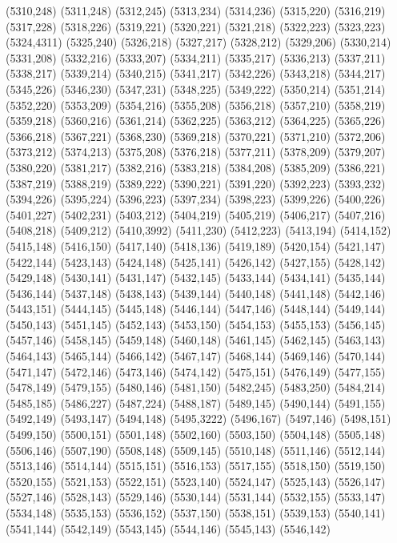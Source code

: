 (5310,248)
(5311,248)
(5312,245)
(5313,234)
(5314,236)
(5315,220)
(5316,219)
(5317,228)
(5318,226)
(5319,221)
(5320,221)
(5321,218)
(5322,223)
(5323,223)
(5324,4311)
(5325,240)
(5326,218)
(5327,217)
(5328,212)
(5329,206)
(5330,214)
(5331,208)
(5332,216)
(5333,207)
(5334,211)
(5335,217)
(5336,213)
(5337,211)
(5338,217)
(5339,214)
(5340,215)
(5341,217)
(5342,226)
(5343,218)
(5344,217)
(5345,226)
(5346,230)
(5347,231)
(5348,225)
(5349,222)
(5350,214)
(5351,214)
(5352,220)
(5353,209)
(5354,216)
(5355,208)
(5356,218)
(5357,210)
(5358,219)
(5359,218)
(5360,216)
(5361,214)
(5362,225)
(5363,212)
(5364,225)
(5365,226)
(5366,218)
(5367,221)
(5368,230)
(5369,218)
(5370,221)
(5371,210)
(5372,206)
(5373,212)
(5374,213)
(5375,208)
(5376,218)
(5377,211)
(5378,209)
(5379,207)
(5380,220)
(5381,217)
(5382,216)
(5383,218)
(5384,208)
(5385,209)
(5386,221)
(5387,219)
(5388,219)
(5389,222)
(5390,221)
(5391,220)
(5392,223)
(5393,232)
(5394,226)
(5395,224)
(5396,223)
(5397,234)
(5398,223)
(5399,226)
(5400,226)
(5401,227)
(5402,231)
(5403,212)
(5404,219)
(5405,219)
(5406,217)
(5407,216)
(5408,218)
(5409,212)
(5410,3992)
(5411,230)
(5412,223)
(5413,194)
(5414,152)
(5415,148)
(5416,150)
(5417,140)
(5418,136)
(5419,189)
(5420,154)
(5421,147)
(5422,144)
(5423,143)
(5424,148)
(5425,141)
(5426,142)
(5427,155)
(5428,142)
(5429,148)
(5430,141)
(5431,147)
(5432,145)
(5433,144)
(5434,141)
(5435,144)
(5436,144)
(5437,148)
(5438,143)
(5439,144)
(5440,148)
(5441,148)
(5442,146)
(5443,151)
(5444,145)
(5445,148)
(5446,144)
(5447,146)
(5448,144)
(5449,144)
(5450,143)
(5451,145)
(5452,143)
(5453,150)
(5454,153)
(5455,153)
(5456,145)
(5457,146)
(5458,145)
(5459,148)
(5460,148)
(5461,145)
(5462,145)
(5463,143)
(5464,143)
(5465,144)
(5466,142)
(5467,147)
(5468,144)
(5469,146)
(5470,144)
(5471,147)
(5472,146)
(5473,146)
(5474,142)
(5475,151)
(5476,149)
(5477,155)
(5478,149)
(5479,155)
(5480,146)
(5481,150)
(5482,245)
(5483,250)
(5484,214)
(5485,185)
(5486,227)
(5487,224)
(5488,187)
(5489,145)
(5490,144)
(5491,155)
(5492,149)
(5493,147)
(5494,148)
(5495,3222)
(5496,167)
(5497,146)
(5498,151)
(5499,150)
(5500,151)
(5501,148)
(5502,160)
(5503,150)
(5504,148)
(5505,148)
(5506,146)
(5507,190)
(5508,148)
(5509,145)
(5510,148)
(5511,146)
(5512,144)
(5513,146)
(5514,144)
(5515,151)
(5516,153)
(5517,155)
(5518,150)
(5519,150)
(5520,155)
(5521,153)
(5522,151)
(5523,140)
(5524,147)
(5525,143)
(5526,147)
(5527,146)
(5528,143)
(5529,146)
(5530,144)
(5531,144)
(5532,155)
(5533,147)
(5534,148)
(5535,153)
(5536,152)
(5537,150)
(5538,151)
(5539,153)
(5540,141)
(5541,144)
(5542,149)
(5543,145)
(5544,146)
(5545,143)
(5546,142)
